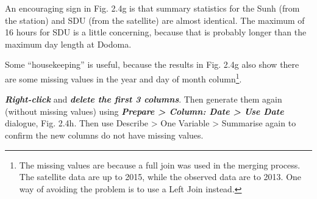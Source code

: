 \documentclass[
  letterpaper,
  DIV=11,
  numbers=noendperiod]{scrreprt}
\begin{document}
An encouraging sign in Fig. 2.4g is that summary statistics for the Sunh
(from the station) and SDU (from the satellite) are almost identical.
The maximum of 16 hours for SDU is a little concerning, because that is
probably longer than the maximum day length at Dodoma.

Some ``housekeeping'' is useful, because the results in Fig. 2.4g also
show there are some missing values in the year and day of month
column\footnote{The missing values are because a full join was used in
  the merging process. The satellite data are up to 2015, while the
  observed data are to 2013. One way of avoiding the problem is to use a
  Left Join instead.}.

\textbf{\emph{Right-click}} and \textbf{\emph{delete the first 3
columns}}. Then generate them again (without missing values) using
\textbf{\emph{Prepare \textgreater{} Column: Date \textgreater{} Use
Date}} dialogue, Fig. 2.4h. Then use Describe \textgreater{} One
Variable \textgreater{} Summarise again to confirm the new columns do
not have missing values.
\end{document}
